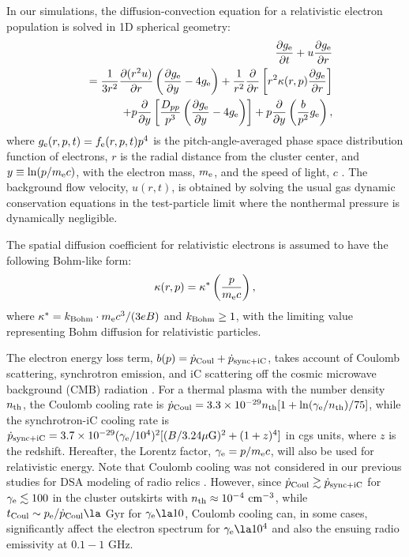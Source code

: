 \documentclass[twocolumn]{aastex61}
\def\cm3{~{\rm cm^{-3}}}
\begin{document}
In our simulations, the diffusion-convection equation for a relativistic electron population is solved 
in 1D spherical geometry:
\begin{eqnarray}
& &{\partial g_{\rm e}\over \partial t} + u {\partial g_{\rm e} \over \partial r} \nonumber\\
& &= {1\over{3r^2}} {{\partial (r^2 u) }\over \partial r} \left( {\partial g_{\rm e}\over
\partial y} -4g_{\rm e} \right) 
+ {1 \over r^2}{\partial \over \partial r} \left[r^2 \kappa(r,p){\partial g_{\rm e} \over \partial r} \right] \nonumber\\
& &+ p {\partial \over \partial y}\left[ {D_{pp} \over p^3} \left( {\partial g_{\rm e}\over \partial y} -4g_{\rm e} \right) \right] 
+ p {\partial \over {\partial y}} \left( {b\over p^2} g_{\rm e} \right),
\label{diffcon}
\end{eqnarray}
where $g_{\rm e}(r,p,t)=f_{\rm e}(r,p,t) p^4$ is the pitch-angle-averaged phase space distribution function
of electrons, $r$ is the radial distance from the cluster center, and $y \equiv \ln(p/m_{\rm e} c)$, 
with the electron mass, $m_{\rm e}$, and the speed of light, $c$ \citep{skill75}.
The background flow velocity, $u(r,t)$, is obtained by solving the usual gas dynamic conservation equations 
in the test-particle limit where the nonthermal pressure is dynamically negligible.

The spatial diffusion coefficient for relativistic electrons is assumed to have 
the following Bohm-like form:
\begin{equation}
\kappa(r,p) = \kappa^* \left({p \over m_{\rm e} c}\right),
\label{Bohm}
\end{equation}
where $\kappa^*= k_{\rm Bohm}\cdot m_{\rm e} c^3/(3eB)$
and $k_{\rm Bohm}\ge 1$, with the limiting value representing Bohm diffusion for relativistic particles.

The electron energy loss term, $b(p)= \dot p_{\rm Coul} + \dot p_{\rm sync+iC} $, takes account of Coulomb scattering, 
synchrotron emission, and iC scattering off the cosmic microwave background (CMB) radiation \citep[e.g.,][]{sarazin99}.
For a thermal plasma with the number density $n_{\rm th}$, the Coulomb cooling rate is
 $\dot p_{\rm Coul}=3.3\times 10^{-29} n_{\rm th} [ 1 + \ln (\gamma_{\rm e}/n_{\rm th})/75]$, while the synchrotron-iC cooling rate is
$\dot p_{\rm sync+iC}=3.7\times 10^{-29} (\gamma_{\rm e}/10^4)^2 [ (B/3.24 \mu {\rm G})^2 + (1+z)^4]$ in cgs units,
where $z$ is the redshift.
Hereafter, the Lorentz factor, $\gamma_{\rm e}=p/m_{\rm e}c$, will also be used for relativistic energy.
Note that Coulomb cooling was not considered in our previous studies for DSA modeling of radio relics
\citep[e.g.,][]{kang12,kangryu15,kang16a, kang16b}.
However, since $\dot p_{\rm Coul}\gtrsim \dot p_{\rm sync+iC}$ for $\gamma_{\rm e} \lesssim 100$ in the cluster outskirts 
with $n_{\rm th}\approx 10^{-4} \cm3$, while $t_{\rm Coul} \sim p_{\rm e} /\dot p_{\rm Coul} \la$ Gyr for $\gamma_{\rm e}\la 10$, 
Coulomb cooling can, in some cases, significantly affect the electron
spectrum for $\gamma_{\rm e} \la 10^4$ and also the ensuing radio emissivity at $0.1-1$ GHz. 
\end{document}
